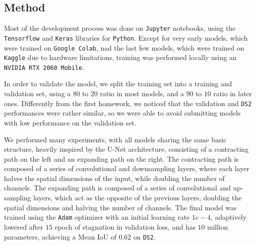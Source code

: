 \documentclass[11pt]{article}
\begin{document}
\begin{multicols}{2}
      \section{Method}



      Most of the development process was done on \texttt{Jupyter} notebooks, using the \texttt{Tensorflow}\cite{TensorFlow} and \texttt{Keras}\cite{chollet2015keras} libraries for \texttt{Python}. Except for very early models, which were trained on \texttt{Google Colab}, nad the last few models, which were trained on \texttt{Kaggle} due to hardware limitations, training was performed locally using an \texttt{NVIDIA RTX 2060 Mobile}.

      In order to validate the model, we split the training set into a training and validation set, using a $80$ to $20$ ratio in most models, and a $90$ to $10$ ratio in later ones. Differently from the first homework, we noticed that the validation and \texttt{DS2} performances were rather similar, so we were able to avoid submitting models with low performance on the validation set.

      We performed many experiments, with all models sharing the same basic structure, heavily inspired by the U-Net\cite{ronneberger2015unetconvolutionalnetworksbiomedical} architecture, consisting of a contracting path on the left and an expanding path on the right. The contracting path is composed of a series of convolutional and downsampling layers, where each layer halves the spatial dimensions of the input, while doubling the number of channels. The expanding path is composed of a series of convolutional and up-sampling layers, which act as the opposite of the previous layers, doubling the spatial dimensions and halving the number of channels. The final model was trained using the \texttt{Adam} optimizer with an initial learning rate $1e-4$, adaptively lowered after $15$ epoch of stagnation in validation loss, and has $10$ million parameters, achieving a Mean IoU of $0.62$ on \texttt{DS2}.


\end{multicols}
\end{document}
